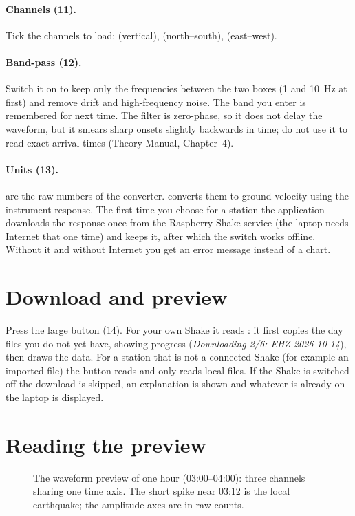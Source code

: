 \paragraph{Channels (11).} Tick the channels to load:  (vertical),  (north--south),  (east--west).

\paragraph{Band-pass (12).} Switch it on to keep only the frequencies between the two boxes (1 and 10~Hz at first) and remove
drift and high-frequency noise. The band you enter is remembered for next time. The filter is zero-phase, so it does not delay the
waveform, but it smears sharp onsets slightly backwards in time; do not use it to read exact arrival times (Theory Manual, Chapter~4).

\paragraph{Units (13).}\label{sec:units}
 are the raw numbers of the converter.  converts them to ground velocity using the instrument response. The first
time you choose  for a station the application downloads the response once from the Raspberry Shake service (the laptop
needs Internet that one time) and keeps it, after which the switch works offline. Without it and without Internet you get an error
message instead of a chart.

\section{Download and preview}
Press the large button (14). For your own Shake it reads : it first copies the day files you do not yet
have, showing progress (\emph{Downloading 2/6: EHZ 2026-10-14}), then draws the data. For a station that is not a connected Shake
(for example an imported file) the button reads  and only reads local files. If the Shake is switched off the
download is skipped, an explanation is shown and whatever is already on the laptop is displayed.

\section{Reading the preview}
\begin{figure}[tbp]
\centering
{}
\caption{The waveform preview of one hour (03:00--04:00): three channels sharing one time axis. The short spike near 03:12 is the
local earthquake; the amplitude axes are in raw counts.}\label{fig:datawf}
\end{figure}

